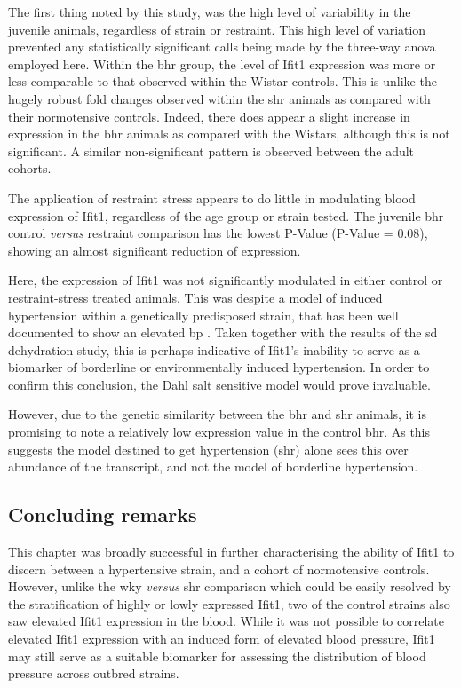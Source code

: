 The first thing noted by this study, was the high level of variability in the juvenile animals, regardless of strain or restraint. This high level of variation prevented any statistically significant calls being made by the three-way \acrshort{anova} employed here. Within the \acrshort{bhr} group, the level of Ifit1 expression was more or less comparable to that observed within the Wistar controls. This is unlike the hugely robust fold changes observed within the \acrshort{shr} animals as compared with their normotensive controls. Indeed, there does appear a slight increase in expression in the \acrshort{bhr} animals as compared with the Wistars, although this is not significant. A similar non-significant pattern is observed between the adult cohorts.

The application of restraint stress appears to do little in modulating blood expression of Ifit1, regardless of the age group or strain tested. The juvenile \acrshort{bhr} control \textit{versus} restraint comparison has the lowest P-Value (P-Value = 0.08), showing an almost significant reduction of expression. 

Here, the expression of Ifit1 was not significantly modulated in either control or restraint-stress treated animals. This was despite a model of induced hypertension within a genetically predisposed strain, that has been well documented to show an elevated \acrshort{bp} \cite{Sarenac2011}. Taken together with the results of the \acrshort{sd} dehydration study, this is perhaps indicative of Ifit1's inability to serve as a biomarker of borderline or environmentally induced hypertension. In order to confirm this conclusion, the Dahl salt sensitive model would prove invaluable.

However, due to the genetic similarity between the \acrshort{bhr} and \acrshort{shr} animals, it is promising to note a relatively low expression value in the control \acrshort{bhr}. As this suggests the model destined to get hypertension (\acrshort{shr}) alone sees this over abundance of the transcript, and not the model of borderline hypertension.

\subsection{Concluding remarks}

This chapter was broadly successful in further characterising the ability of Ifit1 to discern between a hypertensive strain, and a cohort of normotensive controls. However, unlike the \acrshort{wky} \textit{versus} \acrshort{shr} comparison which could be easily resolved by the stratification of highly or lowly expressed Ifit1, two of the control strains also saw elevated Ifit1 expression in the blood. While it was not possible to correlate elevated Ifit1 expression with an induced form of elevated blood pressure, Ifit1 may still serve as a suitable biomarker for assessing the distribution of blood pressure across outbred strains. 

